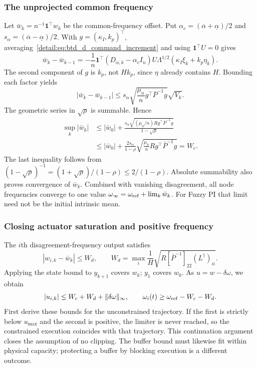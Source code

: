 \subsubsection{The unprojected common frequency}
Let $\bar w_k=n^{-1}\mathbf1^\top w_k$ be the common-frequency offset.
Put $\alpha_c=(\overline\alpha+\underline\alpha)/2$ and
$s_\alpha=(\overline\alpha-\underline\alpha)/2$. With
$g=(\kappa_I,k_p)^\top$, averaging~\eqref{detail:eq:btd_d_command_increment}
and using $\mathbf1^\top U=0$ gives
\begin{equation}
 \bar w_k-\bar w_{k-1}
 =-\frac1n\mathbf1^\top(D_{\alpha,k}-\alpha_c I_n)
 U\Lambda^{1/2}(\kappa_I\xi_k+k_p\eta_k).
 \label{detail:eq:btd_d_common_increment}
\end{equation}
The second component of $g$ is $k_p$, not $Hk_p$, since $\eta$ already
contains $H$. Bounding each factor yields
\begin{equation}
 |\bar w_k-\bar w_{k-1}|
 \le s_\alpha\sqrt{\frac{\mu_n}{n}g^\top\bar P^{-1}g}\sqrt{V_k}.
 \label{detail:eq:btd_d_common_step_bound}
\end{equation}
The geometric series in $\sqrt{\rho}$ is summable. Hence
\begin{align}
 \sup_k|\bar w_k|
 &\le |\bar w_0|+
 \frac{s_\alpha\sqrt{(\mu_n/n)R g^\top\bar P^{-1}g}}{1-\sqrt\rho}
 \nonumber\\
 &\le |\bar w_0|+\frac{2s_\alpha}{1-\rho}
 \sqrt{\frac{\mu_n}{n}R g^\top\bar P^{-1}g}=W_c.
 \label{detail:eq:btd_clock_bounds}
\end{align}
The last inequality follows from
$(1-\sqrt\rho)^{-1}=(1+\sqrt\rho)/(1-\rho)\le2/(1-\rho)$.
Absolute summability also proves convergence of $\bar w_k$. Combined with
vanishing disagreement, all node frequencies converge to one value
$\omega_\infty=\omega_{\rm ref}+\lim_k\bar w_k$.
For Fuzzy PI that limit need not be the initial intrinsic mean.

\subsubsection{Closing actuator saturation and positive frequency}
The $i$th disagreement-frequency output satisfies
\begin{equation}
 |w_{i,k}-\bar w_k|\le W_d,
 \qquad W_d=\max_i\frac1H
 \sqrt{R[\bar P^{-1}]_{22}(L^\dagger)_{ii}}.
 \label{detail:eq:btd_d_node_frequency}
\end{equation}
Applying the state bound to $y_{k+1}$ covers $w_k$; $y_1$ covers $w_0$.
As $u=w-\delta\omega$, we obtain
\begin{equation}
 |u_{i,k}|\le W_c+W_d+\|\delta\omega\|_\infty,
 \qquad \omega_i(t)\ge\omega_{\rm ref}-W_c-W_d.
 \label{detail:eq:btd_actuator_bounds}
\end{equation}
First derive these bounds for the unconstrained trajectory. If the first
is strictly below $u_{\max}$ and the second is positive, the limiter is
never reached, so the constrained execution coincides with that trajectory.
This continuation argument closes the assumption of no clipping. The
buffer bound must likewise fit within physical capacity; protecting a
buffer by blocking execution is a different outcome.

